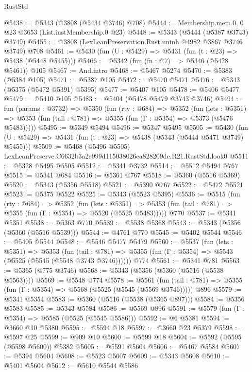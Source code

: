\begin{lexlean}{RustStd}
\begin{coremodule}
@5438 := @5343 (@3808 (@5434 @3746) @708)
@5444 := Membership.mem.{0, 0} @23 @3653 (List.instMembership.{0} @23)
@5448 := @5343 (@5444 (@5387 @3743) @3749)
@5455 := @3808 (LexLeanPreservation.Rust.uninh @4982 @3867 @3746 @3749) @708
@5461 := @5430 (fun (U : @5429) => @5431 (fun (t : @23) => @5438 (@5448 @5455)))
@5466 := @5342 (fun (fn : @7) => @5346 (@5428 @5461)) @105
@5467 := And.intro
@5468 := @5467 @5274
@5470 := @5383 (@5384 @105)
@5471 := @5387 @105
@5472 := @5470 @5471
@5476 := @5343 (@5375 (@5472 @5391) @5395)
@5477 := @5407 @105
@5478 := @5406 @5477
@5479 := @5410 @105
@5483 := @5404 (@5478 @5479 @3743 @3746)
@5494 := fun (params : @3732) =>
  @5350
    (fun (rty : @684) =>
    @5352
      (fun (lets : @5351) =>
      @5353 (fun (tail : @781) => @5355 (fun (Γ : @5354) => @5373 (@5476 @5483)))))
@5495 := @5349 @5494
@5496 := @5347 @5495
@5505 := @5430 (fun (U : @5429) => @5431 (fun (t : @23) => @5438 (@5343 (@5444 @5471 @3749) @5455)))
@5509 := @5468 (@5496 @5505) LexLeanPreserve.C6632b3a2e999d115038026ca828209de.R21.RustStd.look0
@5511 := @5328 @5495 @5505
@5512 := @5341 @3732
@5514 := @5512 @5494 @767
@5515 := @5341 @684
@5516 := @5361 @767
@5518 := @5360 (@5516 @5369)
@5520 := @5343 (@5356 @5518)
@5521 := @5390 @767
@5522 := @5472 @5521
@5523 := @5375 @5522
@5525 := @5343 (@5523 @5395)
@5536 := @5515
    (fun (rty : @684) =>
    @5352
      (fun (lets : @5351) =>
      @5353 (fun (tail : @781) => @5355 (fun (Γ : @5354) => @5520 (@5525 @5483)))))
    @770
@5537 := @5341 @5351
@5538 := @5363 @770
@5539 := @5538 @5368
@5543 := @5343 (@5356 (@5360 (@5516 @5539)))
@5544 := @4761 @770
@5545 := @5402 @5544
@5546 := @5405 @5544
@5548 := @5546 @5477 @5479
@5560 := @5537
    (fun (lets : @5351) =>
    @5353
      (fun (tail : @781) => @5355 (fun (Γ : @5354) => @5543 (@5525 (@5545 (@5548 @3743 @3746))))))
    @774
@5561 := @5341 @781
@5563 := @5365 (@775 @3746)
@5568 := @5343 (@5356 (@5360 (@5516 (@5538 @5563))))
@5569 := @5548 @774
@5578 := @5561
    (fun (tail : @781) => @5355 (fun (Γ : @5354) => @5568 (@5525 (@5545 (@5569 @3746)))))
    @896
@5579 := @5341 @5354
@5583 := @5360 (@5516 (@5538 (@5365 @897)))
@5584 := @5356 @5583
@5585 := @5343 @5584
@5586 := @5569 @896
@5591 := @5579 (fun (Γ : @5354) => @5585 (@5525 (@5545 @5586)))
@5592 := @6 @5381
@5594 := @3660 @10 @5380
@5595 := @5594 @18
@5597 := @3660 @23 @5379
@5598 := @5597 @25
@5599 := @909 @10
@5600 := @5599 @18
@5604 := @5592 (@5595 (@5598 @5600)) @5382
@5605 := @5591 @5604
@5606 := @5467 @5584
@5607 := @5394 @5604
@5608 := @5523 @5607
@5609 := @5343 @5608
@5610 := @5401 @5604
@5612 := @5610 @5544 @5586

\end{coremodule}
\end{lexlean}
